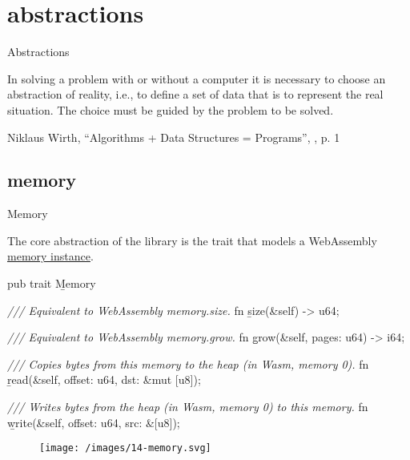 \documentclass{article}
\begin{document}
\section{abstractions}{Abstractions}
\epigraph{
  In solving a problem with or without a computer it is necessary to choose an abstraction of reality, i.e., to define a set of data that is to represent the real situation.
  The choice must be guided by the problem to be solved.
}{Niklaus Wirth, ``Algorithms + Data Structures = Programs'', , p. 1}

\subsection{memory}{Memory}

The core abstraction of the library is the \href{https://docs.rs/ic-stable-structures/latest/ic_stable_structures/trait.Memory.html}{} trait that models a WebAssembly \href{https://webassembly.github.io/multi-memory/core/exec/runtime.html#memory-instances}{memory instance}.

\begin{code}[rust]
pub trait \b{Memory} {
    \emph{/// Equivalent to WebAssembly memory.size.}
    fn \b{size}(&self) -> u64;

    \emph{/// Equivalent to WebAssembly memory.grow.}
    fn \b{grow}(&self, pages: u64) -> i64;

    \emph{/// Copies bytes from this memory to the heap (in Wasm, memory 0).}
    fn \b{read}(&self, offset: u64, dst: &mut [u8]);

    \emph{/// Writes bytes from the heap (in Wasm, memory 0) to this memory.}
    fn \b{write}(&self, offset: u64, src: &[u8]);
}
\end{code}

\begin{figure}[grayscale-diagram]
\texttt{[image: /images/14-memory.svg]}
\end{figure}
\end{document}
